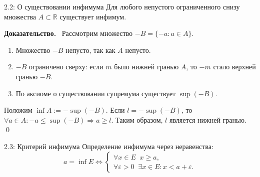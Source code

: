 \documentclass[a4paper,12pt]{article}
\newcommand{\myproof}{\textbf{Доказательство.}\ }
\begin{document}
	\begin{theorembox}{2.2: О существовании инфимума}
		Для любого непустого ограниченного снизу множества $A \subset \mathbb{R}$ существует инфимум.
	\end{theorembox}
	
	\myproof
	Рассмотрим множество $-B = \{ -a : a \in A \}$. 
	\begin{enumerate}
		\item Множество $-B$ непусто, так как $A$ непусто.
		\item $-B$ ограничено сверху: если $m$ было нижней гранью $A$, то $-m$ стало верхней гранью $-B$. 
		\item По аксиоме о существовании супремума существует $\sup(-B)$.
	\end{enumerate}
	Положим $\inf A := -\sup(-B)$. 
	Если $l = -\sup(-B)$, то $\forall a \in A \colon -a \le \sup(-B) \Rightarrow a \ge l$. Таким образом, $l$ является нижней гранью. \qed
	
	\begin{remarkbox}{2.3: Критерий инфимума}
		Определение инфимума через неравенства:
		\[
		a = \inf E \iff 
		\begin{cases}
			\forall x \in E \;\; x \geqslant a, \\
			\forall \varepsilon > 0 \;\; \exists x \in E \colon x < a + \varepsilon.
		\end{cases}
		\]
	\end{remarkbox}
\end{document}
